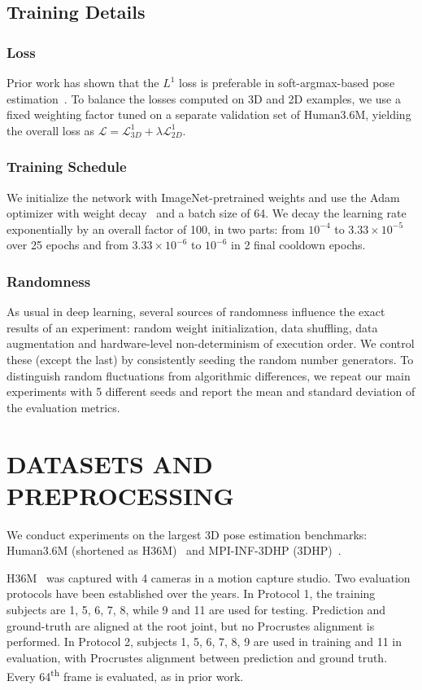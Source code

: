 \subsection{Training Details}
\subsubsection{Loss} Prior work has shown that the $L^1$ loss is preferable in soft-argmax-based pose estimation~\cite{Sun18ECCV}.
To balance the losses computed on 3D and 2D examples, we use a fixed weighting factor tuned on a separate validation set of Human3.6M, yielding the overall loss as $\mathcal{L} = \mathcal{L}^1_{3D} +  \lambda \mathcal{L}^1_{2D}$.

\subsubsection{Training Schedule} We initialize the network with ImageNet-pretrained weights and use the Adam optimizer with weight decay~\cite{Loshchilov19ICLR} and a batch size of 64.
We decay the learning rate exponentially by an overall factor of 100, in two parts: from $10^{-4}$ to $3.33\times 10^{-5}$ over 25 epochs and from $3.33\times 10^{-6}$ to $10^{-6}$ in 2 final cooldown epochs.

\subsubsection{Randomness} As usual in deep learning, several sources of randomness influence the exact results of an experiment: random weight initialization, data shuffling, data augmentation and hardware-level non-determinism of execution order.
We control these (except the last) by consistently seeding the random number generators.
To distinguish random fluctuations from algorithmic differences, we repeat our main experiments with 5 different seeds and report the mean and standard deviation of the evaluation metrics.
\section{\uppercase{Datasets and Preprocessing}}
We conduct experiments on the largest 3D pose estimation benchmarks: Human3.6M (shortened as H36M)~\cite{Ionescu11ICCV,Ionescu14PAMI} and MPI-INF-3DHP (3DHP)~\cite{Mehta17TDV}.

H36M~\cite{Ionescu11ICCV,Ionescu14PAMI} was captured with 4 cameras in a motion capture studio.
Two evaluation protocols have been established over the years.
In Protocol 1, the training subjects are 1, 5, 6, 7, 8, while 9 and 11 are used for testing.
Prediction and ground-truth are aligned at the root joint, but no Procrustes alignment is performed.
In Protocol 2, subjects 1, 5, 6, 7, 8, 9 are used in training and 11 in evaluation, with Procrustes alignment between prediction and ground truth.
Every 64\textsuperscript{th} frame is evaluated, as in prior work.

